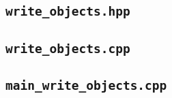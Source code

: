 {\subsection*{\texttt{write\_objects.hpp}}

\lstset{style=cppstyle}
\vspace{0.2cm}

\vspace{0.4cm}

\subsection*{\texttt{write\_objects.cpp}}

\vspace{0.2cm}

\vspace{0.4cm}

\subsection*{\texttt{main\_write\_objects.cpp}}

\vspace{0.2cm}

\vspace{0.4cm}
}
\printbibliography


